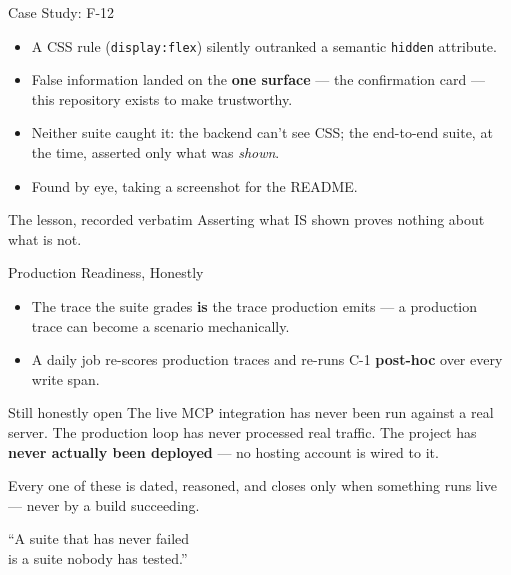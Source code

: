 \documentclass[aspectratio=169]{beamer}
\newcommand{\code}[1]{\texttt{#1}}
\begin{document}
\begin{frame}{Case Study: F-12}
  \begin{itemize}
    \item A CSS rule (\code{display:flex}) silently outranked a semantic
      \code{hidden} attribute.
    \item False information landed on the \textbf{one surface} --- the
      confirmation card --- this repository exists to make trustworthy.
    \item Neither suite caught it: the backend can't see CSS; the
      end-to-end suite, at the time, asserted only what was \emph{shown}.
    \item Found by eye, taking a screenshot for the README.
  \end{itemize}
  \vspace{0.8em}
  \begin{block}{The lesson, recorded verbatim}
    Asserting what IS shown proves nothing about what is not.
  \end{block}
\end{frame}

\begin{frame}{Production Readiness, Honestly}
  \small
  \begin{itemize}
    \item The trace the suite grades \textbf{is} the trace production
      emits --- a production trace can become a scenario mechanically.
    \item A daily job re-scores production traces and re-runs C-1
      \textbf{post-hoc} over every write span.
  \end{itemize}
  \vspace{0.4em}
  \begin{alertblock}{Still honestly open}
    \small The live MCP integration has never been run against a real
    server. The production loop has never processed real traffic. The
    project has \textbf{never actually been deployed} --- no hosting
    account is wired to it.
  \end{alertblock}
  \small Every one of these is dated, reasoned, and closes only when
  something runs live --- never by a build succeeding.
\end{frame}

\begin{frame}[standout]
  ``A suite that has never failed \\ is a suite nobody has tested.''
\end{frame}
\end{document}
